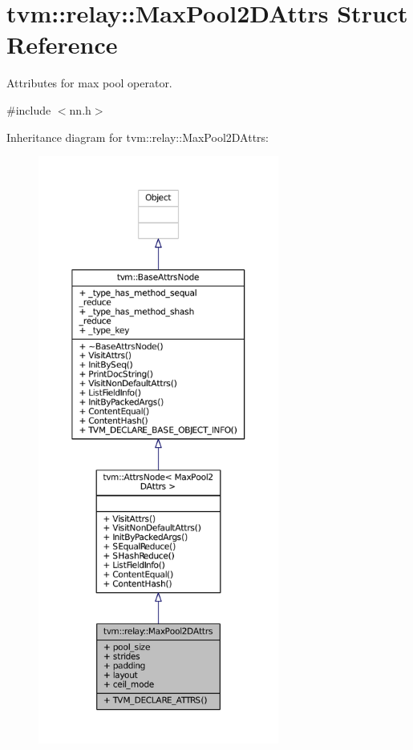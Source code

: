 \hypertarget{structtvm_1_1relay_1_1MaxPool2DAttrs}{}\section{tvm\+:\+:relay\+:\+:Max\+Pool2\+D\+Attrs Struct Reference}
\label{structtvm_1_1relay_1_1MaxPool2DAttrs}


Attributes for max pool operator.  




{\ttfamily \#include $<$nn.\+h$>$}



Inheritance diagram for tvm\+:\+:relay\+:\+:Max\+Pool2\+D\+Attrs\+:
\nopagebreak
\begin{figure}[H]
\begin{center}
\leavevmode
\includegraphics[height=550pt]{structtvm_1_1relay_1_1MaxPool2DAttrs__inherit__graph}
\end{center}
\end{figure}


